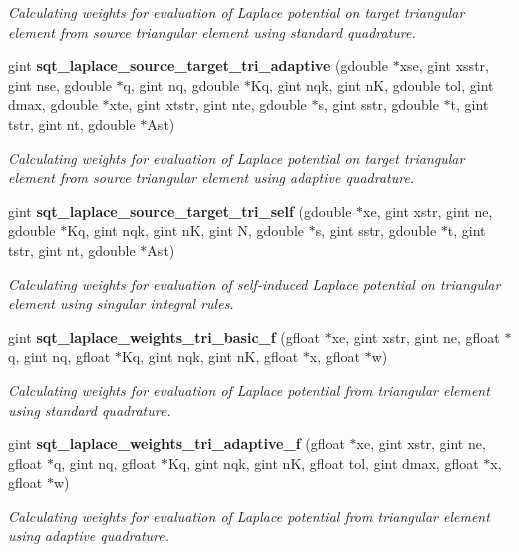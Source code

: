 \begin{DoxyCompactItemize}
\begin{DoxyCompactList}\small\item\em Calculating weights for evaluation of Laplace potential on target triangular element from source triangular element using standard quadrature. \end{DoxyCompactList}\item 
gint {\bf sqt\+\_\+laplace\+\_\+source\+\_\+target\+\_\+tri\+\_\+adaptive} (gdouble $\ast$xse, gint xsstr, gint nse, gdouble $\ast$q, gint nq, gdouble $\ast$Kq, gint nqk, gint n\+K, gdouble tol, gint dmax, gdouble $\ast$xte, gint xtstr, gint nte, gdouble $\ast$s, gint sstr, gdouble $\ast$t, gint tstr, gint nt, gdouble $\ast$Ast)
\begin{DoxyCompactList}\small\item\em Calculating weights for evaluation of Laplace potential on target triangular element from source triangular element using adaptive quadrature. \end{DoxyCompactList}\item 
gint {\bf sqt\+\_\+laplace\+\_\+source\+\_\+target\+\_\+tri\+\_\+self} (gdouble $\ast$xe, gint xstr, gint ne, gdouble $\ast$Kq, gint nqk, gint n\+K, gint N, gdouble $\ast$s, gint sstr, gdouble $\ast$t, gint tstr, gint nt, gdouble $\ast$Ast)
\begin{DoxyCompactList}\small\item\em Calculating weights for evaluation of self-\/induced Laplace potential on triangular element using singular integral rules. \end{DoxyCompactList}\item 
gint {\bf sqt\+\_\+laplace\+\_\+weights\+\_\+tri\+\_\+basic\+\_\+f} (gfloat $\ast$xe, gint xstr, gint ne, gfloat $\ast$q, gint nq, gfloat $\ast$Kq, gint nqk, gint n\+K, gfloat $\ast$x, gfloat $\ast$w)
\begin{DoxyCompactList}\small\item\em Calculating weights for evaluation of Laplace potential from triangular element using standard quadrature. \end{DoxyCompactList}\item 
gint {\bf sqt\+\_\+laplace\+\_\+weights\+\_\+tri\+\_\+adaptive\+\_\+f} (gfloat $\ast$xe, gint xstr, gint ne, gfloat $\ast$q, gint nq, gfloat $\ast$Kq, gint nqk, gint n\+K, gfloat tol, gint dmax, gfloat $\ast$x, gfloat $\ast$w)
\begin{DoxyCompactList}\small\item\em Calculating weights for evaluation of Laplace potential from triangular element using adaptive quadrature. \end{DoxyCompactList}\item 

\end{DoxyCompactItemize}
